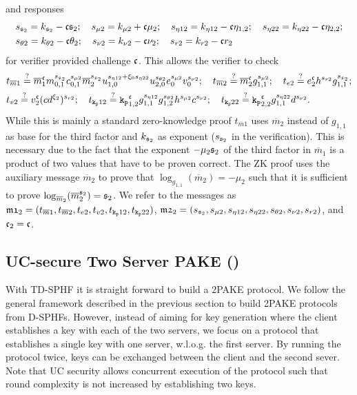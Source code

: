 and responses
\begin{align*}
  & s_{\mathfrak{s}_2} = k_{\mathfrak{s}_2} - \mathfrak{c}\mathfrak{s}_2; ~~~ s_{\mu2} = k_{\mu2} + \mathfrak{c}\mu_2; ~~~ s_{\eta12} = k_{\eta12} - \mathfrak{c}\eta_{1,2}; ~~~ s_{\eta22} = k_{\eta22} - \mathfrak{c}\eta_{2,2}; \\
  & s_{\theta2} = k_{\theta2} - \mathfrak{c}\theta_2; ~~~ s_{\nu2} = k_{\nu2} - \mathfrak{c}\nu_2; ~~~ s_{r2} = k_{r2} - \mathfrak{c} r_2
\end{align*}
for verifier provided challenge $\mathfrak{c}$.
This allows the verifier to check
\begin{align*}
  & t_{\overline{m}1} \stackrel{?}{=} \overline{m}_1^\mathfrak{c} m_{0,1}^{s_{\mathfrak{s}_2}} c_{0,1}^{s_{\mu2}} \overline{m}_{2}^{s_{\mathfrak{s}_2}} u_{1,0}^{s_{\eta12} + \xi_0 s_{\eta22}} u_{2,0}^{s_{\theta2}} e_0^{s_{\mu2}} v_0^{s_{\nu2}}; ~~~ 
    t_{\overline{m}2} \stackrel{?}{=} \overline{m}_2^\mathfrak{c} g_{1,1}^{s_{\mu2}}; ~~~  t_{e2} \stackrel{?}{=} e_2^\mathfrak{c} h^{s_{r2}}g_{1,1}^{s_{\mathfrak{s}_2}}; \\
  & t_{v2} \stackrel{?}{=} v_2^\mathfrak{c} (cd^{\xi_2})^{s_{r2}}; ~~~
    t_{\mathtt{k_p}12} \stackrel{?}{=} \mathtt{k_p}_{1,2}^\mathfrak{c} g_{1,1}^{s_{\eta12}} g_{1,2}^{s_{\theta2}} h^{s_{\mu2}} c^{s_{\nu2}}; ~~~ 
    t_{\mathtt{k_p}22} \stackrel{?}{=} \mathtt{k_p}_{2,2}^\mathfrak{c} g_{1,1}^{s_{\eta22}} d^{s_{\nu2}} .
\end{align*}
While this is mainly a standard zero-knowledge proof $t_{\overline{m}1}$ uses $\overline{m}_2$ instead of $g_{1,1}$ as base for the third factor and $k_{\mathfrak{s}_2}$ as exponent ($s_{\mathfrak{s}_2}$ in the verification).
This is necessary due to the fact that the exponent $-\mu_2 {\mathfrak{s}_2}$ of the third factor in $\overline{m}_1$ is a product of two values that have to be proven correct.
The \ac{ZK} proof uses the auxiliary message $\overline{m}_2$ to prove that $\log_{g_{1,1}}(\overline{m}_2)=-\mu_2$ such that it is sufficient to prove $\log_{\overline{m}_2}(\overline{m}_2^{{\mathfrak{s}_2}})={\mathfrak{s}_2}$.
We refer to the messages as $\mathfrak{m1}_{2}=(t_{\overline{m}1}, t_{\overline{m}2}, t_{e2}, t_{v2}, t_{\mathtt{k_p}12}, t_{\mathtt{k_p}22})$, $\mathfrak{m2}_{2}=(s_{\mathfrak{s}_2}, s_{\mu2}, s_{\eta12}, s_{\eta22}, s_{\theta2}, s_{\nu2}, s_{r2})$, and $\mathfrak{c}_{2}=\mathfrak{c}$.


\subsection{UC-secure Two Server PAKE (\FTWOPAKE)}\label{sec:2pake}
With \ac{TD-SPHF} it is straight forward to build a \ac{2PAKE} protocol.
We follow the general framework described in the previous section to build \ac{2PAKE} protocols from \acp{D-SPHF}.
However, instead of aiming for key generation where the client establishes a key with each of the two servers, we focus on a protocol that establishes a single key with one server, w.l.o.g. the first server.
By running the protocol twice, keys can be exchanged between the client and the second sever.
Note that \ac{UC} security allows concurrent execution of the protocol such that round complexity is not increased by establishing two keys.

